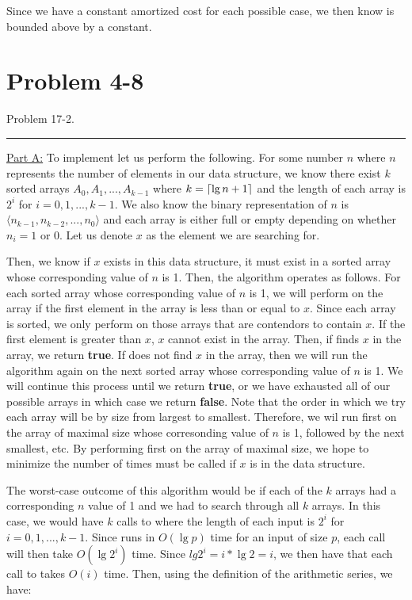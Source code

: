 \documentclass[11pt]{article}
\def\separateline{\medskip\hrule\medskip}
\DeclarePairedDelimiter{\ceil}{\lceil}{\rceil}
\begin{document}
Since we have a constant amortized cost for each possible case, we then know  is bounded above by a constant.

\newpage

\section{Problem 4-8}
Problem 17-2.
\separateline

\underline{Part A:} To implement  let us perform the following. For some number $n$ where $n$ represents the number of elements in our data structure, we know there exist $k$ sorted arrays $A_0, A_1, ..., A_{k-1}$ where $k = \ceil{\lg{n+1}}$ and the length of each array is $2^i$ for $i = 0,1,...,k-1$. We also know the binary representation of $n$ is $\langle n_{k-1}, n_{k-2}, ..., n_0 \rangle$ and each array is either full or empty depending on whether $n_i = 1$ or 0. Let us denote $x$ as the element we are searching for.

Then, we know if $x$ exists in this data structure, it must exist in a sorted array whose corresponding value of $n$ is 1. Then, the algorithm operates as follows. For each sorted array whose corresponding value of $n$ is 1, we will perform  on the array if the first element in the array is less than or equal to $x$. Since each array is sorted, we only perform  on those arrays that are contendors to contain $x$. If the first element is greater than $x$, $x$ cannot exist in the array. Then, if  finds $x$ in the array, we return \textbf{true}. If  does not find $x$ in the array, then we will run the algorithm again on the next sorted array whose corresponding value of $n$ is 1. We will continue this process until we return \textbf{true}, or we have exhausted all of our possible arrays in which case we return \textbf{false}. Note that the order in which we try each array will be by size from largest to smallest. Therefore, we wil run  first on the array of maximal size whose corresonding value of $n$ is 1, followed by the next smallest, etc. By performing  first on the array of maximal size, we hope to minimize the number of times  must be called if $x$ is in the data structure.

The worst-case outcome of this algorithm would be if each of the $k$ arrays had a corresponding $n$ value of 1 and we had to search through all $k$ arrays. In this case, we would have $k$ calls to  where the length of each input is $2^i$ for $i = 0,1,...,k-1$. Since  runs in $O(\lg{p})$ time for an input of size $p$, each call will then take $O(\lg{2^i})$ time. Since $lg{2^i} = i * \lg{2} = i$, we then have that each call to  takes $O(i)$ time. Then, using the definition of the arithmetic series, we have:
\end{document}
